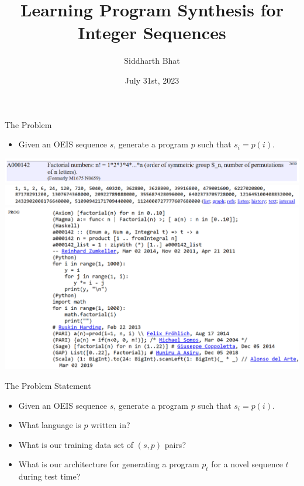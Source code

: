 \documentclass[8pt]{beamer}
\author{Siddharth Bhat}
\date{July 31st, 2023}
\institute{MSR \\ AI4Code}
\title{Learning Program Synthesis for Integer Sequences}
\begin{document}
\maketitle

\begin{frame}[fragile]{The Problem}
\begin{itemize}
\item Given an OEIS sequence $s$, generate a program $p$ such that $s_i = p(i)$. \pause
\end{itemize}
\includegraphics[width=\textwidth]{./catalan-1.png} \pause
\includegraphics[width=\textwidth]{./catalan-2.png} \pause
\includegraphics[width=\textwidth]{./catalan-3.png} \pause
\end{frame}

\begin{frame}[fragile]{The Problem Statement}
\begin{itemize}
\item Given an OEIS sequence $s$, generate a program $p$ such that $s_i = p(i)$. \pause
\item What language is $p$ written in? 
\item What is our training data set of $(s, p)$ pairs?
\item What is our architecture for generating a program $p_t$ for a novel sequence $t$ during test time?
\end{itemize}
\end{frame}
\end{document}
